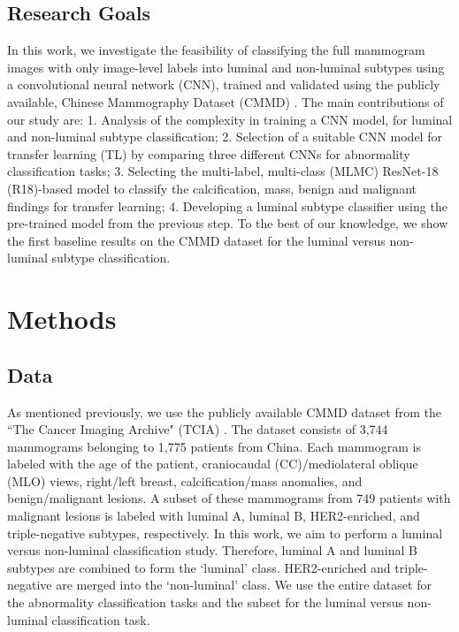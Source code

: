 \documentclass{article}
\begin{document}
\subsection{Research Goals}
In this work, we investigate the feasibility of classifying the full mammogram images with only image-level labels into luminal and non-luminal subtypes using a convolutional neural network (CNN), trained and validated using the publicly available, Chinese Mammography Dataset (CMMD) \cite{cui2021chinese}. The main contributions of our study are: 1. Analysis of the complexity in training a CNN model, for luminal and non-luminal subtype classification; 2. Selection of a suitable CNN model for transfer learning (TL) by comparing three different CNNs for abnormality classification tasks; 3. Selecting the multi-label, multi-class (MLMC) ResNet-18 (R18)-based model to classify the calcification, mass, benign and malignant findings for transfer learning; 4. Developing a luminal subtype classifier using the pre-trained model from the previous step. To the best of our knowledge, we show the first baseline results on the CMMD dataset for the luminal versus non-luminal subtype classification. 








\section{Methods}
\label{sec:methods}
\subsection{Data}


As mentioned previously, we use the publicly available CMMD dataset from the ``The Cancer Imaging Archive" (TCIA) \cite{cui2021chinese, clark2013cancer}. The dataset consists of 3,744 mammograms belonging to 1,775 patients from China. Each mammogram is labeled with the age of the patient, craniocaudal (CC)/mediolateral oblique (MLO) views, right/left breast, calcification/mass anomalies, and benign/malignant lesions. A subset of these mammograms from 749 patients with malignant lesions is labeled with luminal A, luminal B, HER2-enriched, and triple-negative subtypes, respectively. In this work, we aim to perform a luminal versus non-luminal classification study. Therefore, luminal A and luminal B subtypes are combined to form the `luminal' class. HER2-enriched and triple-negative are merged into the `non-luminal' class. We use the entire dataset for the abnormality classification tasks and the subset for the luminal versus non-luminal classification task. 
\end{document}
